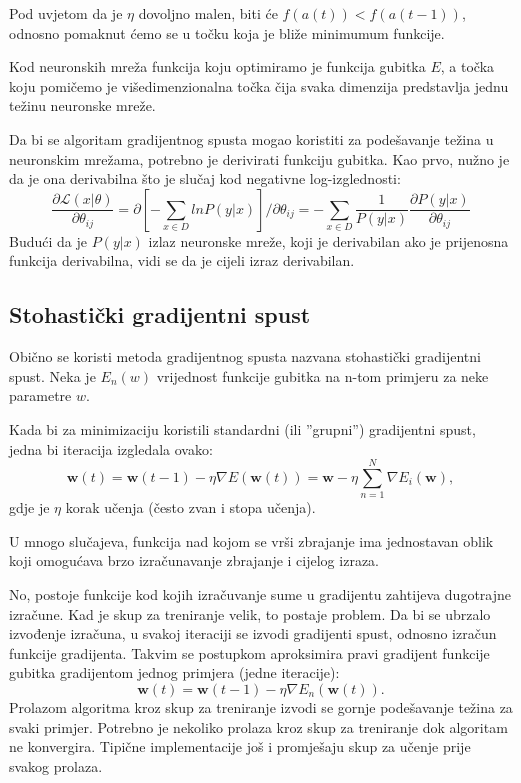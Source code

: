 \documentclass[times, utf8, diplomski, numeric]{fer}
\begin{document}
Pod uvjetom da je $\eta$ dovoljno malen, biti će $f(a(t)) < f(a(t-1))$, odnosno pomaknut ćemo se u točku koja je bliže minimumum funkcije.

Kod neuronskih mreža funkcija koju optimiramo je funkcija gubitka $E$, a točka koju pomičemo je višedimenzionalna točka čija svaka dimenzija predstavlja jednu težinu neuronske mreže.

Da bi se algoritam gradijentnog spusta mogao koristiti za podešavanje težina u neuronskim mrežama, potrebno je derivirati funkciju gubitka. Kao prvo, nužno je da je ona derivabilna što je slučaj kod negativne log-izglednosti:
\begin{equation}
  \frac{\partial \mathcal{L}(x | \theta)}{\partial \theta_{ij}}
  	= \partial \left[ - \sum_{x \in D} ln P (y|x) \right] / \partial \theta_{ij}
    = - \sum_{x \in D} \frac{1}{P(y|x)} \frac{\partial P(y|x)}{\partial \theta_{ij}}
\end{equation}
Budući da je $P(y|x)$ izlaz neuronske mreže, koji je derivabilan ako je prijenosna funkcija derivabilna, vidi se da je cijeli izraz derivabilan.

\subsection{Stohastički gradijentni spust}

Obično se koristi metoda gradijentnog spusta nazvana stohastički gradijentni spust. Neka je $E_n(w)$ vrijednost funkcije gubitka na n-tom primjeru za neke parametre $w$.

Kada bi za minimizaciju koristili standardni (ili ''grupni'') gradijentni spust, jedna bi iteracija izgledala ovako:
\begin{equation}
    \boldsymbol{w}(t) = \boldsymbol{w}(t-1) - \eta \nabla E(\boldsymbol{w}(t)) = \boldsymbol{w} - \eta \sum_{n=1}^N \nabla E_i(\boldsymbol{w}),
\end{equation}
gdje je $\eta$ korak učenja (često zvan i stopa učenja).

U mnogo slučajeva, funkcija nad kojom se vrši zbrajanje ima jednostavan oblik koji omogućava brzo izračunavanje zbrajanje i cijelog izraza.

No, postoje funkcije kod kojih izračuvanje sume u gradijentu zahtijeva dugotrajne izračune. Kad je skup za treniranje velik, to postaje problem. Da bi se ubrzalo izvođenje izračuna, u svakoj iteraciji se izvodi gradijenti spust, odnosno izračun funkcije gradijenta. Takvim se postupkom aproksimira pravi gradijent funkcije gubitka gradijentom jednog primjera (jedne iteracije):
\begin{equation}
    \boldsymbol{w}(t) = \boldsymbol{w}(t-1) - \eta \nabla E_n(\boldsymbol{w}(t)).
\end{equation}
Prolazom algoritma kroz skup za treniranje izvodi se gornje podešavanje težina za svaki primjer. Potrebno je nekoliko prolaza kroz skup za treniranje dok algoritam ne konvergira. Tipične implementacije još i promješaju skup za učenje prije svakog prolaza.
\end{document}
